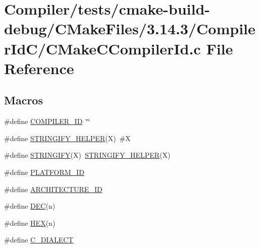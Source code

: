 \hypertarget{_compiler_2tests_2cmake-build-debug_2_c_make_files_23_814_83_2_compiler_id_c_2_c_make_c_compiler_id_8c}{}\section{Compiler/tests/cmake-\/build-\/debug/\+C\+Make\+Files/3.14.3/\+Compiler\+Id\+C/\+C\+Make\+C\+Compiler\+Id.c File Reference}
\label{_compiler_2tests_2cmake-build-debug_2_c_make_files_23_814_83_2_compiler_id_c_2_c_make_c_compiler_id_8c}
\subsection*{Macros}
\begin{DoxyCompactItemize}
\item 
\#define \mbox{\hyperlink{_compiler_2tests_2cmake-build-debug_2_c_make_files_23_814_83_2_compiler_id_c_2_c_make_c_compiler_id_8c_a81dee0709ded976b2e0319239f72d174}{C\+O\+M\+P\+I\+L\+E\+R\+\_\+\+ID}}~\char`\"{}\char`\"{}
\item 
\#define \mbox{\hyperlink{_compiler_2tests_2cmake-build-debug_2_c_make_files_23_814_83_2_compiler_id_c_2_c_make_c_compiler_id_8c_a2ae9b72bb13abaabfcf2ee0ba7d3fa1d}{S\+T\+R\+I\+N\+G\+I\+F\+Y\+\_\+\+H\+E\+L\+P\+ER}}(X)~\#X
\item 
\#define \mbox{\hyperlink{_compiler_2tests_2cmake-build-debug_2_c_make_files_23_814_83_2_compiler_id_c_2_c_make_c_compiler_id_8c_a43e1cad902b6477bec893cb6430bd6c8}{S\+T\+R\+I\+N\+G\+I\+FY}}(X)~\mbox{\hyperlink{_v_m_2cmake-build-debug_2_c_make_files_23_814_83_2_compiler_id_c_x_x_2_c_make_c_x_x_compiler_id_8cpp_a2ae9b72bb13abaabfcf2ee0ba7d3fa1d}{S\+T\+R\+I\+N\+G\+I\+F\+Y\+\_\+\+H\+E\+L\+P\+ER}}(X)
\item 
\#define \mbox{\hyperlink{_compiler_2tests_2cmake-build-debug_2_c_make_files_23_814_83_2_compiler_id_c_2_c_make_c_compiler_id_8c_adbc5372f40838899018fadbc89bd588b}{P\+L\+A\+T\+F\+O\+R\+M\+\_\+\+ID}}
\item 
\#define \mbox{\hyperlink{_compiler_2tests_2cmake-build-debug_2_c_make_files_23_814_83_2_compiler_id_c_2_c_make_c_compiler_id_8c_aba35d0d200deaeb06aee95ca297acb28}{A\+R\+C\+H\+I\+T\+E\+C\+T\+U\+R\+E\+\_\+\+ID}}
\item 
\#define \mbox{\hyperlink{_compiler_2tests_2cmake-build-debug_2_c_make_files_23_814_83_2_compiler_id_c_2_c_make_c_compiler_id_8c_ad1280362da42492bbc11aa78cbf776ad}{D\+EC}}(n)
\item 
\#define \mbox{\hyperlink{_compiler_2tests_2cmake-build-debug_2_c_make_files_23_814_83_2_compiler_id_c_2_c_make_c_compiler_id_8c_a46d5d95daa1bef867bd0179594310ed5}{H\+EX}}(n)
\item 
\#define \mbox{\hyperlink{_compiler_2tests_2cmake-build-debug_2_c_make_files_23_814_83_2_compiler_id_c_2_c_make_c_compiler_id_8c_a07f8e5783674099cd7f5110e22a78cdb}{C\+\_\+\+D\+I\+A\+L\+E\+CT}}
\end{DoxyCompactItemize}
